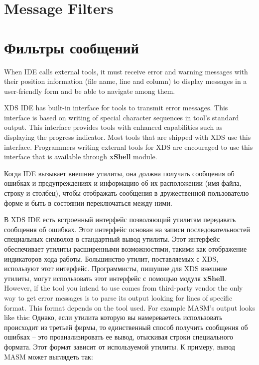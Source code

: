 \ifenglish
\section{Message Filters}
\else
\section{Фильтры сообщений}
\fi
{}

\ifenglish
When IDE calls external tools, it must receive error and
warning messages with their position information (file name, line and column)
to display messages in a user-friendly form and be able to navigate among
them.

XDS IDE has built-in interface for tools to transmit error messages. This
interface is based on writing of special character sequences in tool's
standard output. This interface provides tools with enhanced capabilities such
as displaying the progress indicator. Most tools that are shipped with XDS
use this interface. Programmers writing external tools for XDS are encouraged
to use this interface that is available through {\bf xShell} module.

\else
Когда IDE вызывает внешние утилиты, она должна получать сообщения об ошибках
и предупреждениях и информацию об их расположении (имя файла, строку и столбец),
чтобы отображать сообщения в дружественной пользователю форме и быть в 
состоянии переключаться между ними.

В XDS IDE есть встроенный интерфейс позволяющий утилитам передавать сообщения об
ошибках. Этот интерфейс основан на записи последовательностей специальных 
символов в стандартный вывод утилиты. Этот интерфейс обеспечивает утилиты 
расширенными возможностями, такими как отображение индикаторов хода работы.
Большинство утилит, поставляемых с XDS, используют этот интерфейс. Программисты,
пишушие для XDS внешние утилиты, могут использовать этот интерфейс с помощью
модуля {\bf xShell}.	  
\fi
\ifenglish
However, if the tool you intend to use comes from third-party vendor the
only way to get error messages is to parse its output looking for lines
of specific format. This format depends on the tool used. For example MASM's
output looks like this:
\else
Однако, если утилита которую вы намереваетесь использовать происходит из 
третьей фирмы, то единственный способ получить сообщения об ошибках -- это
проанализировать ее вывод, отыскивая строки специального формата. Этот
формат зависит от используемой утилиты. К примеру, вывод MASM может выглядеть
так:  
\fi

